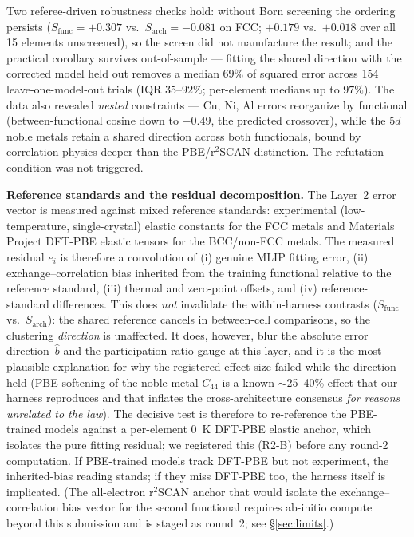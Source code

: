 \documentclass[11pt]{article}
\theoremstyle{remark}
\begin{document}
Two referee-driven robustness checks hold: without Born screening the
ordering persists ($S_{\mathrm{func}} = +0.307$ vs.\
$S_{\mathrm{arch}} = -0.081$ on FCC; $+0.179$ vs.\ $+0.018$ over all 15
elements unscreened), so the screen did not manufacture the result; and the
practical corollary survives out-of-sample --- fitting the shared direction
with the corrected model held out removes a median $69\%$ of squared error
across 154 leave-one-model-out trials (IQR $35$--$92\%$; per-element medians
up to $97\%$). The data also revealed \emph{nested} constraints --- Cu, Ni,
Al errors reorganize by functional (between-functional cosine down to $-0.49$,
the predicted crossover), while the $5d$ noble metals retain a shared direction
across both functionals, bound by correlation physics deeper than the
PBE/r$^2$SCAN distinction. The refutation condition was not triggered.

\textbf{Reference standards and the residual decomposition.} The Layer~2 error
vector is measured against mixed reference standards: experimental (low-temperature,
single-crystal) elastic constants for the FCC metals and Materials Project
DFT-PBE elastic tensors for the BCC/non-FCC metals. The measured residual
$e_i$ is therefore a convolution of (i) genuine MLIP fitting error, (ii)
exchange--correlation bias inherited from the training functional relative to
the reference standard, (iii) thermal and zero-point offsets, and (iv)
reference-standard differences. This does \emph{not} invalidate the within-harness
contrasts ($S_{\mathrm{func}}$ vs.\ $S_{\mathrm{arch}}$): the shared reference
cancels in between-cell comparisons, so the clustering \emph{direction} is
unaffected. It does, however, blur the absolute error direction~$\hat b$ and the
participation-ratio gauge at this layer, and it is the most plausible
explanation for why the registered effect size failed while the direction held
(PBE softening of the noble-metal $C_{44}$ is a known $\sim$25--40\% effect that
our harness reproduces and that inflates the cross-architecture consensus
\emph{for reasons unrelated to the law}). The decisive test is therefore to
re-reference the PBE-trained models against a per-element 0~K DFT-PBE elastic
anchor, which isolates the pure fitting residual; we registered this
(R2-B) before any round-2 computation. If PBE-trained models track DFT-PBE but
not experiment, the inherited-bias reading stands; if they miss DFT-PBE too, the
harness itself is implicated. (The all-electron r$^2$SCAN anchor that would
isolate the exchange--correlation bias vector for the second functional requires
ab-initio compute beyond this submission and is staged as round~2; see
\S\ref{sec:limits}.)
\end{document}
